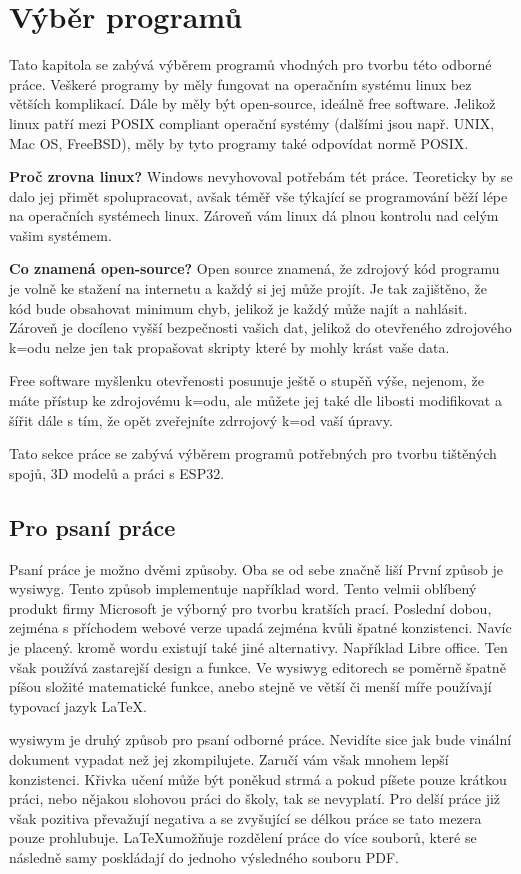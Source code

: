 \section{Výběr programů}
Tato kapitola se zabývá výběrem programů vhodných pro tvorbu této odborné práce. Veškeré programy by měly fungovat na operačním systému linux bez větších komplikací. Dále by měly být open-source, ideálně free software. Jelikož linux patří mezi POSIX compliant operační systémy (dalšími jsou např. UNIX, Mac OS, FreeBSD), měly by tyto programy také odpovídat normě POSIX.

\textbf{Proč zrovna linux?}
Windows nevyhovoval potřebám tét práce. Teoreticky by se dalo jej přimět spolupracovat, avšak téměř vše týkající se programování běží lépe na operačních systémech linux. Zároveň vám linux dá plnou kontrolu nad celým vašim systémem.

\textbf{Co znamená open-source?}
Open source znamená, že zdrojový kód programu je volně ke stažení na internetu a každý si jej může projít. Je tak zajištěno, že kód bude obsahovat minimum chyb, jelikož je každý může najít a nahlásit. Zároveň je docíleno vyšší bezpečnosti vašich dat, jelikož do otevřeného zdrojového k=odu nelze jen tak propašovat skripty které by mohly krást vaše data.

Free software myšlenku otevřenosti posunuje ještě o stupěň výše, nejenom, že máte přístup ke zdrojovému k=odu, ale můžete jej také dle libosti modifikovat a šířit dále s tím, že opět zveřejníte zdrrojový k=od vaší úpravy.

Tato sekce práce se zabývá výběrem programů potřebných pro tvorbu tištěných spojů, 3D modelů a práci s ESP32.

\subsection{Pro psaní práce}
Psaní práce je možno dvěmi způsoby. Oba se od sebe značně liší
První způsob je \ac{wysiwyg}. Tento způsob implementuje například \ac{word}. Tento velmii oblíbený produkt firmy Microsoft je výborný pro tvorbu kratších prací. Poslední dobou, zejména s příchodem webové verze upadá zejména kvůli špatné konzistenci. Navíc je placený.
kromě \ac{word}u existují také jiné alternativy. Například Libre office. Ten však používá zastarejší design a funkce.
Ve \ac{wysiwyg} editorech se poměrně špatně píšou složité matematické funkce, anebo stejně ve větší či menší míře používají typovací jazyk \LaTeX.


\ac{wysiwym} je druhý způsob pro psaní odborné práce.
Nevidíte sice jak bude vinální dokument vypadat než jej zkompilujete.
Zaručí vám však mnohem lepší konzistenci.
Křivka učení může být poněkud strmá a pokud píšete pouze krátkou práci, nebo nějakou slohovou práci do školy, tak se nevyplatí.
Pro delší práce již však pozitiva převažují negativa a se zvyšující se délkou práce se tato mezera pouze prohlubuje.
\LaTeX umožňuje rozdělení práce do více souborů, které se následně samy poskládají do jednoho výsledného souboru PDF.

